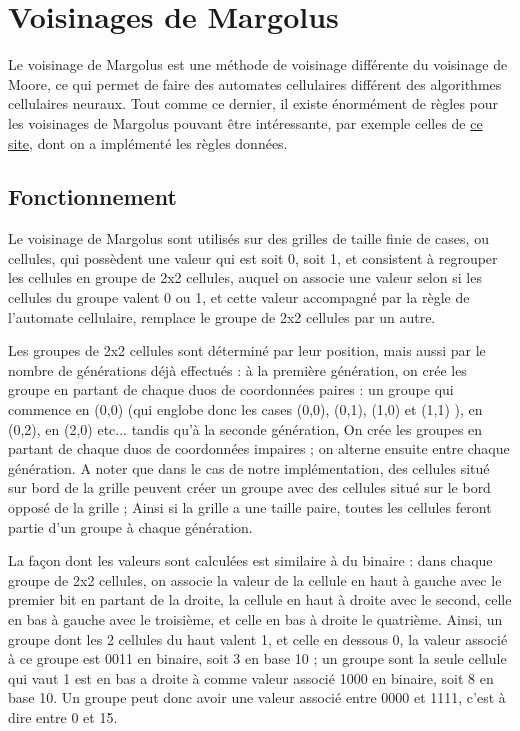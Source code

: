 \section{Voisinages de Margolus}

\par Le voisinage de Margolus est une méthode de voisinage différente du voisinage de Moore, ce qui permet de faire des automates cellulaires différent des algorithmes cellulaires neuraux. Tout comme ce dernier, il existe énormément de règles pour les voisinages de Margolus pouvant être intéressante, par exemple celles de \href{https://dmishin.github.io/js-revca/}{ce site}, dont on a implémenté les règles données.

\subsection{Fonctionnement}

\par Le voisinage de Margolus sont utilisés sur des grilles de taille finie de cases, ou cellules, qui possèdent une valeur qui est soit 0, soit 1, et consistent à regrouper les cellules en groupe de 2x2 cellules, auquel on associe une valeur selon si les cellules du groupe valent 0 ou 1, et cette valeur accompagné par la règle de l'automate cellulaire, remplace le groupe de 2x2 cellules par un autre.

\par Les groupes de 2x2 cellules sont déterminé par leur position, mais aussi par le nombre de générations déjà effectués : à la première génération, on crée les groupe en partant de chaque duos de coordonnées paires : un groupe qui commence en (0,0) (qui englobe donc les cases (0,0), (0,1), (1,0) et (1,1) ), en (0,2), en (2,0) etc... tandis qu'à la seconde génération, On crée les groupes en partant de chaque duos de coordonnées impaires ; on alterne ensuite entre chaque génération. A noter que dans le cas de notre implémentation, des cellules situé sur bord de la grille peuvent créer un groupe avec des cellules situé sur le bord opposé de la grille ; Ainsi si la grille a une taille paire, toutes les cellules feront partie d'un groupe à chaque génération.

\par La façon dont les valeurs sont calculées est similaire à du binaire : dans chaque groupe de 2x2 cellules, on associe la valeur de la cellule en haut à gauche avec le premier bit en partant de la droite, la cellule en haut à droite avec le second, celle en bas à gauche avec le troisième, et celle en bas à droite le quatrième. Ainsi, un groupe dont les 2 cellules du haut valent 1, et celle en dessous 0, la valeur associé à ce groupe est 0011 en binaire, soit 3 en base 10 ; un groupe sont la seule cellule qui vaut 1 est en bas a droite à comme valeur associé 1000 en binaire, soit 8 en base 10. Un groupe peut donc avoir une valeur associé entre 0000 et 1111, c'est à dire entre 0 et 15.



